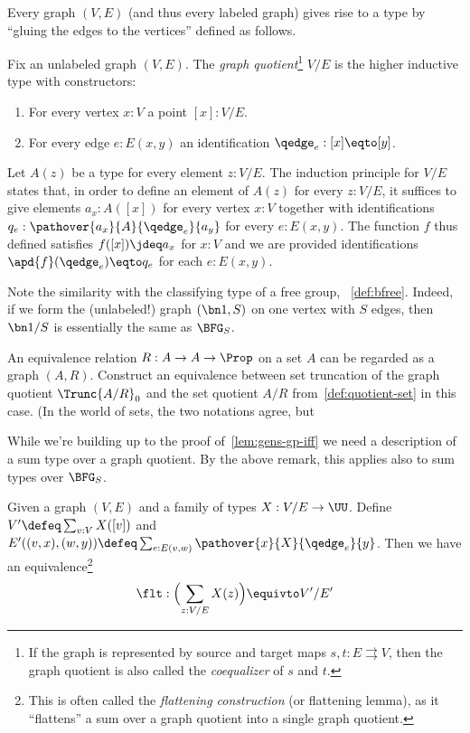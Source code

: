 Every graph $(V,E)$ (and thus every labeled graph) gives rise to a type
by ``gluing the edges to the vertices'' defined as follows.
\begin{definition}
  Fix an unlabeled graph $(V,E)$. The \emph{graph quotient}\footnote{%
    If the graph is represented by source and target maps
    $s,t: E \rightrightarrows V$, then the graph quotient is
  also called the \emph{coequalizer} of $s$ and $t$.} $V/E$ is
  the higher inductive type with constructors:
  \begin{enumerate}
  \item For every vertex $x : V$ a point $[x] : V/E$.
  \item For every edge $e : E(x,y)$ an identification $\qedge_e : [x] \eqto [y]$.
  \end{enumerate}

  Let $A(z)$ be a type for every element $z:V/E$. The induction principle
  for $V/E$ states that, in order to define an element of $A(z)$ for every $z:V/E$,
  it suffices to give elements $a_x : A([x])$ for every vertex $x:V$
  together with
  identifications $q_e : \pathover{a_x}{A}{\qedge_e}{a_y}$
  for every $e:E(x,y)$.
  The function $f$ thus defined satisfies $f([x])\jdeq a_x$ for $x:V$
  and we are provided identifications $\apd{f}(\qedge_e)\eqto q_e$ for each $e:E(x,y)$.
\end{definition}
\begin{remark}
  Note the similarity with the classifying type of a free group,
  \cf~\cref{def:bfree}. Indeed, if we form the (unlabeled!)
  graph $(\bn 1,S)$
  on one vertex with $S$ edges, then $\bn 1/S$ is essentially the same as $\BFG_S$.
\end{remark}
\begin{xca}
  An equivalence relation $R : A \to A \to \Prop$ on a set $A$
  can be regarded as a graph $(A,R)$.
  Construct an equivalence between set truncation of the graph quotient $\Trunc{A/R}_0$
  and the set quotient $A/R$ from~\cref{def:quotient-set} in this case.
  (In the world of sets, the two notations agree, but 
\end{xca}
While we're building up to the proof of~\cref{lem:gens-gp-iff} we need
a description of a sum type over a graph quotient.
By the above remark, this applies also to sum types over $\BFG_S$.
\begin{construction}\label{def:graph-quotient-flattening}
  Given a graph $(V,E)$ and a family of types $X : V/E \to \UU$.
  Define $V' \defeq \sum_{v:V}X([v])$ and
  $E'((v,x),(w,y)) \defeq \sum_{e:E(v,w)}\pathover{x}{X}{\qedge_e}{y}$.
  Then we have an equivalence\footnote{%
    This is often called the \emph{flattening construction} (or flattening lemma),
    as it ``flattens'' a sum over a graph quotient into a single graph quotient.}
  \[
    \flt : \Bigl(\sum_{z:V/E}X(z)\Bigr) \equivto V'/E'
  \]
\end{construction}

